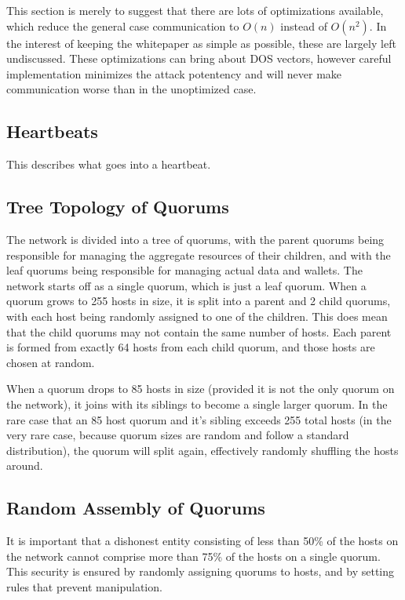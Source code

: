 \documentclass[twocolumn]{article}
\begin{document}
This section is merely to suggest that there are lots of optimizations available, which reduce the general case communication to $O(n)$ instead of $O(n^2)$.
In the interest of keeping the whitepaper as simple as possible, these are largely left undiscussed.
These optimizations can bring about DOS vectors, however careful implementation minimizes the attack potentency and will never make communication worse than in the unoptimized case.

\subsection{Heartbeats}
This describes what goes into a heartbeat.

\subsection{Tree Topology of Quorums}
The network is divided into a tree of quorums, with the parent quorums being responsible for managing the aggregate resources of their children, and with the leaf quorums being responsible for managing actual data and wallets.
The network starts off as a single quorum, which is just a leaf quorum.
When a quorum grows to 255 hosts in size, it is split into a parent and 2 child quorums, with each host being randomly assigned to one of the children.
This does mean that the child quorums may not contain the same number of hosts.
Each parent is formed from exactly 64 hosts from each child quorum, and those hosts are chosen at random.

When a quorum drops to 85 hosts in size (provided it is not the only quorum on the network), it joins with its siblings to become a single larger quorum.
In the rare case that an 85 host quorum and it's sibling exceeds 255 total hosts (in the very rare case, because quorum sizes are random and follow a standard distribution), the quorum will split again, effectively randomly shuffling the hosts around.


\subsection{Random Assembly of Quorums}
It is important that a dishonest entity consisting of less than 50\% of the hosts on the network cannot comprise more than 75\% of the hosts on a single quorum.
This security is ensured by randomly assigning quorums to hosts, and by setting rules that prevent manipulation.
\end{document}

